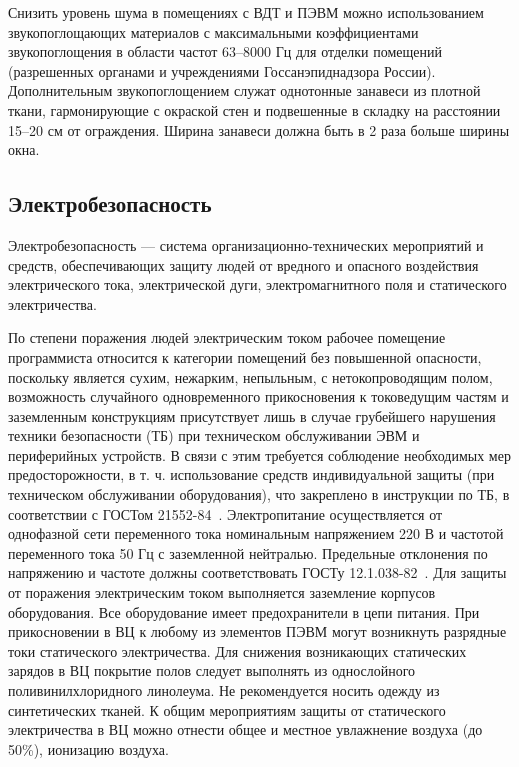 Снизить уровень шума в помещениях с ВДТ и ПЭВМ можно использованием звукопоглощающих материалов с максимальными коэффициентами звукопоглощения в области частот 63--8000 Гц для отделки помещений (разрешенных органами и учреждениями Госсанэпиднадзора России). Дополнительным звукопоглощением служат однотонные занавеси из плотной ткани, гармонирующие с окраской стен и подвешенные в складку на расстоянии 15--20 см от ограждения. Ширина занавеси должна быть в 2 раза больше ширины окна. 

\subsection{Электробезопасность}
\label{sec:bgd:electricity}
Электробезопасность --- система организационно-технических мероприятий и средств, обеспечивающих защиту людей от вредного и опасного воздействия электрического тока, электрической дуги, электромагнитного поля и статического электричества.

По степени поражения людей электрическим током рабочее помещение программиста относится к категории помещений без повышенной опасности, поскольку является сухим, нежарким, непыльным, с нетокопроводящим полом, возможность случайного одновременного прикосновения к токоведущим частям и заземленным конструкциям присутствует лишь в случае грубейшего нарушения техники безопасности (ТБ) при техническом обслуживании ЭВМ и периферийных устройств. В связи с этим требуется соблюдение необходимых мер предосторожности, в т. ч. использование средств индивидуальной защиты (при техническом обслуживании оборудования), что закреплено в инструкции по ТБ, в соответствии с ГОСТом 21552-84~\cite{BGDGost_21552-84}. Электропитание осуществляется от однофазной сети переменного тока номинальным напряжением 220 В и частотой переменного тока 50 Гц с заземленной нейтралью. Предельные отклонения по напряжению и частоте должны соответствовать ГОСТу 12.1.038-82~\cite{BGDGost_12_1_038_82}. Для защиты от поражения электрическим током выполняется заземление корпусов оборудования. Все оборудование имеет предохранители в цепи питания. При прикосновении в ВЦ к любому из элементов ПЭВМ могут возникнуть разрядные токи статического электричества. Для снижения возникающих статических зарядов в ВЦ покрытие полов следует выполнять из однослойного поливинилхлоридного линолеума. Не рекомендуется носить одежду из синтетических тканей. К общим мероприятиям защиты от статического электричества в ВЦ можно отнести общее и местное увлажнение воздуха (до 50\%), ионизацию воздуха.

